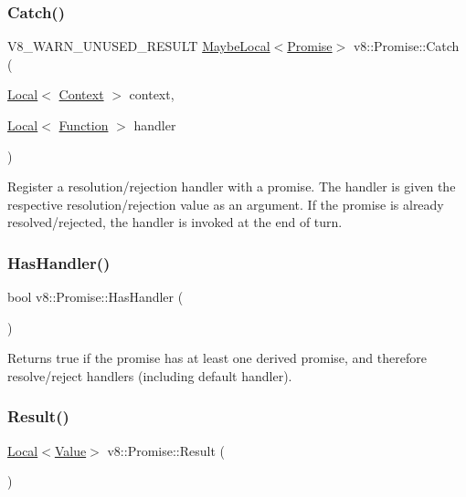 \subsubsection{\texorpdfstring{Catch()}{Catch()}}
{\footnotesize\ttfamily V8\+\_\+\+W\+A\+R\+N\+\_\+\+U\+N\+U\+S\+E\+D\+\_\+\+R\+E\+S\+U\+LT \mbox{\hyperlink{classv8_1_1MaybeLocal}{Maybe\+Local}}$<$\mbox{\hyperlink{classv8_1_1Promise}{Promise}}$>$ v8\+::\+Promise\+::\+Catch (\begin{DoxyParamCaption}\item[{\mbox{\hyperlink{classv8_1_1Local}{Local}}$<$ \mbox{\hyperlink{classv8_1_1Context}{Context}} $>$}]{context,  }\item[{\mbox{\hyperlink{classv8_1_1Local}{Local}}$<$ \mbox{\hyperlink{classv8_1_1Function}{Function}} $>$}]{handler }\end{DoxyParamCaption})}

Register a resolution/rejection handler with a promise. The handler is given the respective resolution/rejection value as an argument. If the promise is already resolved/rejected, the handler is invoked at the end of turn. \mbox{\label{classv8_1_1Promise_aeea8bdfdbe2291632d7f0d45394c1722}} 
\subsubsection{\texorpdfstring{Has\+Handler()}{HasHandler()}}
{\footnotesize\ttfamily bool v8\+::\+Promise\+::\+Has\+Handler (\begin{DoxyParamCaption}{ }\end{DoxyParamCaption})}

Returns true if the promise has at least one derived promise, and therefore resolve/reject handlers (including default handler). \mbox{\label{classv8_1_1Promise_a94aceab6e2ad55f37e6997b4dcac2f11}} 
\subsubsection{\texorpdfstring{Result()}{Result()}}
{\footnotesize\ttfamily \mbox{\hyperlink{classv8_1_1Local}{Local}}$<$\mbox{\hyperlink{classv8_1_1Value}{Value}}$>$ v8\+::\+Promise\+::\+Result (\begin{DoxyParamCaption}{ }\end{DoxyParamCaption})}

